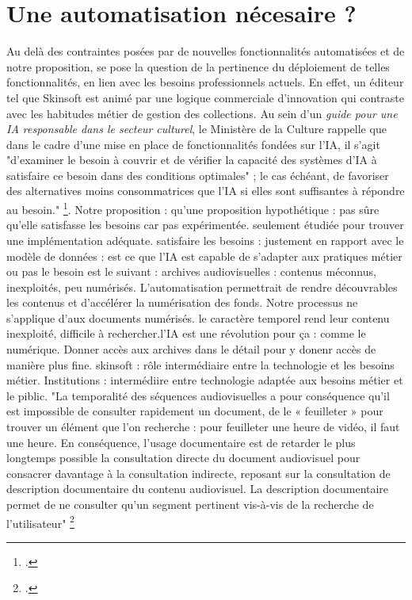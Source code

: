 \section{\label{III_2_C} Une automatisation nécesaire ?}

Au delà des contraintes posées par de nouvelles fonctionnalités automatisées et de notre proposition, se pose la question de la pertinence du déploiement de telles fonctionnalités, en lien avec les besoins professionnels actuels. En effet, un éditeur tel que Skinsoft est animé par une logique commerciale d'innovation qui contraste avec les habitudes métier de gestion des collections. Au sein d'un \textit{guide pour une IA responsable dans le secteur culturel}, le Ministère de la Culture rappelle que dans le cadre d'une mise en place de fonctionnalités fondées sur l'IA, il s'agit "d’examiner le besoin à couvrir et de vérifier la capacité des systèmes d’IA à satisfaire ce besoin dans des conditions optimales" ; le cas échéant, de favoriser des alternatives moins consommatrices que l’IA si elles sont suffisantes à répondre au besoin." \footcite{2025a}.
Notre proposition : qu'une proposition hypothétique : pas sûre qu'elle satisfasse les besoins car pas expérimentée. seulement étudiée pour trouver une implémentation adéquate. 
satisfaire les besoins : justement en rapport avec le modèle de données : est ce que l'IA est capable de s'adapter aux pratiques métier ou pas
le besoin est le suivant : archives audiovisuelles : contenus méconnus, inexploités, peu numérisés. L'automatisation permettrait de rendre découvrables les contenus et d'accélérer la numérisation des fonds. Notre processus ne s'applique d'aux documents numérisés. le caractère temporel rend leur contenu inexploité, difficile à rechercher.l'IA est une révolution pour ça : comme le numérique. Donner accès aux archives dans le détail pour y donenr accès de manière plus fine. skinsoft : rôle intermédiaire entre la technologie et les besoins métier. Institutions : intermédiire entre technologie adaptée aux besoins métier et le piblic. 
"La temporalité des séquences audiovisuelles a pour conséquence qu’il est impossible de consulter rapidement un document, de le « feuilleter » pour trouver un élément que l’on recherche : pour feuilleter une heure de vidéo, il faut une heure. En conséquence, l’usage documentaire est de retarder le plus longtemps possible la consultation directe du document audiovisuel pour consacrer davantage à la consultation indirecte, reposant sur la consultation de description documentaire du contenu audiovisuel. La description documentaire permet de ne consulter qu’un segment pertinent vis-à-vis de la recherche de l’utilisateur" \footcite{bachimont}
